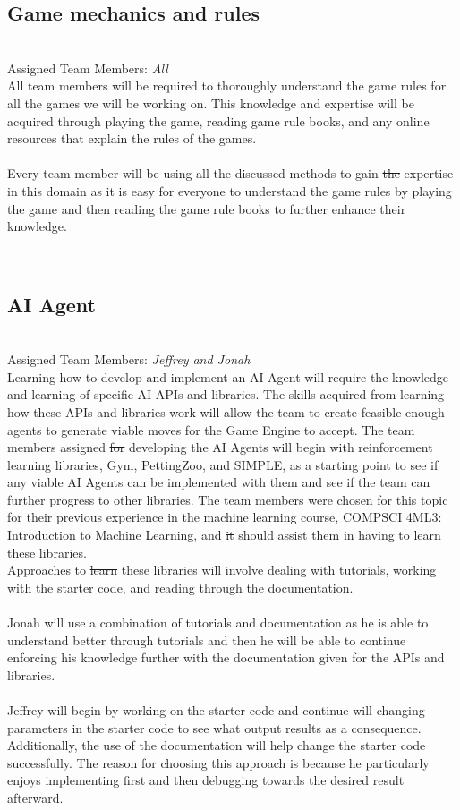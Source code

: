 \documentclass[12pt]{article}
\providecommand{\DIFaddtex}[1]{{\protect\color{blue}\uwave{#1}}} %
\providecommand{\DIFdeltex}[1]{{\protect\color{red}\sout{#1}}}                      %
\providecommand{\DIFaddbegin}{} %
\providecommand{\DIFaddend}{} %
\providecommand{\DIFdelbegin}{} %
\providecommand{\DIFdelend}{} %
\providecommand{\DIFadd}[1]{\texorpdfstring{\DIFaddtex{#1}}{#1}} %
\providecommand{\DIFdel}[1]{\texorpdfstring{\DIFdeltex{#1}}{}} %
\newcommand{\DIFscaledelfig}{0.5}
\newlength{\DIFdelgraphicswidth} %
\newlength{\DIFdelgraphicsheight} %
\newcommand{\DIFaddincludegraphics}[2][]{{\color{blue}\fbox{\DIFOincludegraphics[#1]{#2}}}} %
\newcommand{\DIFdelincludegraphics}[2][]{%
\sbox{\DIFdelgraphicsbox}{\DIFOincludegraphics[#1]{#2}}%
\settoboxwidth{\DIFdelgraphicswidth}{\DIFdelgraphicsbox} %
\settoboxtotalheight{\DIFdelgraphicsheight}{\DIFdelgraphicsbox} %
\scalebox{\DIFscaledelfig}{%
\parbox[b]{\DIFdelgraphicswidth}{\usebox{\DIFdelgraphicsbox}\\[-\baselineskip] \rule{\DIFdelgraphicswidth}{0em}}\llap{\resizebox{\DIFdelgraphicswidth}{\DIFdelgraphicsheight}{%
\setlength{\unitlength}{\DIFdelgraphicswidth}%
\begin{picture}(1,1)%
\thicklines\linethickness{2pt} %
{\color[rgb]{1,0,0}\put(0,0){\framebox(1,1){}}}%
{\color[rgb]{1,0,0}\put(0,0){\line( 1,1){1}}}%
{\color[rgb]{1,0,0}\put(0,1){\line(1,-1){1}}}%
\end{picture}%
}\hspace*{3pt}}} %
} %
\DeclareRobustCommand{\DIFaddbegin}{\DIFOaddbegin \let\includegraphics\DIFaddincludegraphics} %
\DeclareRobustCommand{\DIFaddend}{\DIFOaddend \let\includegraphics\DIFOincludegraphics} %
\DeclareRobustCommand{\DIFdelbegin}{\DIFOdelbegin \let\includegraphics\DIFdelincludegraphics} %
\DeclareRobustCommand{\DIFdelend}{\DIFOaddend \let\includegraphics\DIFOincludegraphics} %
\begin{document}
\subsection{Game mechanics and rules}
\\
Assigned Team Members: \textit{All}
\\
All team members will be required to thoroughly understand the game rules for all the games we will be working on. This knowledge and expertise will be acquired through playing the game, reading game rule books, and any online resources that explain the rules of the games.
\\\\
Every team member will be using all the discussed methods to gain \DIFdelbegin \DIFdel{the }\DIFdelend expertise in this domain as it is easy for everyone to understand the game rules by playing the game and then reading the game rule books to further enhance their knowledge.

\\
\subsection{AI Agent}
\\
Assigned Team Members: \textit{Jeffrey and Jonah}
\\
Learning how to develop and implement an AI Agent will require the knowledge and learning of specific AI APIs and libraries. The skills acquired from learning how these APIs and libraries work will allow the team to create feasible enough agents to generate viable moves for the Game Engine to accept. The team members assigned \DIFdelbegin \DIFdel{for }\DIFdelend \DIFaddbegin \DIFadd{to }\DIFaddend developing the AI Agents will begin with reinforcement learning libraries, Gym, PettingZoo, and SIMPLE, as a starting point to see if any viable AI Agents can be implemented with them and see if the team can further progress to other libraries. The team members were chosen for this topic for their previous experience in the machine learning course, COMPSCI 4ML3: Introduction to Machine Learning, and \DIFdelbegin \DIFdel{it }\DIFdelend should assist them in having to learn these libraries.
\\
Approaches to \DIFdelbegin \DIFdel{learn }\DIFdelend \DIFaddbegin \DIFadd{learning }\DIFaddend these libraries will involve dealing with tutorials, working with the starter code, and reading through the documentation.
\\\\
Jonah will use a combination of tutorials and documentation as he is able to understand better through tutorials and then he will be able to continue enforcing his knowledge further with the documentation given for the APIs and libraries.
\\\\
Jeffrey will begin by working on the starter code and continue will changing parameters in the starter code to see what output results as a consequence. Additionally, the use of the documentation will help change the starter code successfully. The reason for choosing this approach is because he particularly enjoys implementing first and then debugging towards the desired result afterward.
\end{document}
